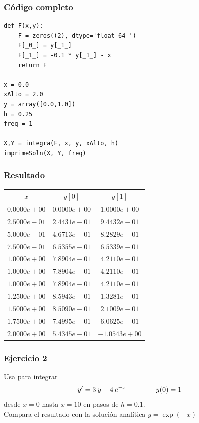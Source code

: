 \begin{frame}
\frametitle{Código completo}
\begin{lstlisting}[caption=Código para el ejercicio, style=FormattedNumber, basicstyle=\linespread{1.1}\ttfamily=\small, columns=fullflexible]
def F(x,y):
    F = zeros((2), dtype='float_64_')
    F[_0_] = y[_1_]
    F[_1_] = -0.1 * y[_1_] - x
    return F

x = 0.0
xAlto = 2.0
y = array([0.0,1.0])
h = 0.25
freq = 1

X,Y = integra(F, x, y, xAlto, h)
imprimeSoln(X, Y, freq)
\end{lstlisting}
\end{frame}
\begin{frame}[plain]
\frametitle{Resultado}
\fontsize{10}{10}\selectfont
\begin{center}
\begin{tabular}{c | c | c }
$x$ & $y[0]$ & $y[1]$ \\ \hline
$0.0000e+00$ & $0.0000e+00$ & $1.0000e+00$ \\ \hline   
$2.5000e-01$ & $2.4431e-01$ & $9.4432e-01$ \\ \hline 
$5.0000e-01$ & $4.6713e-01$ & $8.2829e-01$ \\ \hline
$7.5000e-01$ & $6.5355e-01$ & $6.5339e-01$ \\ \hline
$1.0000e+00$ & $7.8904e-01$ & $4.2110e-01$ \\ \hline
$1.0000e+00$ & $7.8904e-01$ & $4.2110e-01$ \\ \hline
$1.0000e+00$ & $7.8904e-01$ & $4.2110e-01$ \\ \hline
$1.2500e+00$ & $8.5943e-01$ & $1.3281e-01$ \\ \hline
$1.5000e+00$ & $8.5090e-01$ & $2.1009e-01$ \\ \hline 
$1.7500e+00$ & $7.4995e-01$ & $6.0625e-01$ \\ \hline 
$2.0000e+00$ & $5.4345e-01$ & $-1.0543e+00$ \\ \hline 
\end{tabular}
\end{center}
\end{frame}
\begin{frame}
\frametitle{Ejercicio 2}
Usa  para integrar
\[ y^{\prime} = 3 \: y - 4 \: e^{-x} \hspace{1.5cm} y(0)=1 \]
desde $x = 0$ hasta $x = 10$ en pasos de $h = 0.1$. 
\\
\bigskip
Compara el resultado con la solución analítica $y = \exp(-x)$
\end{frame}

